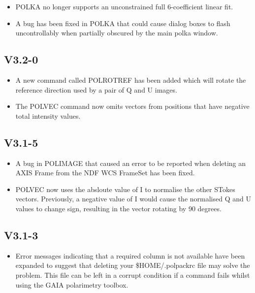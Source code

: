 \documentclass[twoside,11pt]{starlink}
\begin{document}
\begin{itemize}
 \item POLKA no longer supports an unconstrained full 6-coefficient linear fit.
 \item A bug has been fixed in POLKA that could cause dialog boxes to flash
  uncontrollably when partially obscured by the main polka window.
\end{itemize}


\subsection{V3.2-0}

\begin{itemize}
 \item A new command called POLROTREF has been added which will rotate
 the reference direction used by a pair of Q and U images.
 \item The POLVEC command now omits vectors from positions that have
 negative total intensity values.
\end{itemize}


\subsection{V3.1-5}

\begin{itemize}
 \item A bug in POLIMAGE that caused an error to be reported when deleting
 an AXIS Frame from the NDF WCS FrameSet has been fixed.

 \item POLVEC now uses the absloute value of I to normalise the other STokes
 vectors. Previously, a negative value of I would cause the normalised Q
 and U values to change sign, resulting in the vector rotating by 90
 degrees.
\end{itemize}


\subsection{V3.1-3}

\begin{itemize}
 \item Error messages indicating that a required column is not available
 have been expanded to suggest that deleting your \$HOME/.polpackrc
 file may solve the problem. This file can be left in a corrupt condition
 if a command fails whilst using the GAIA polarimetry toolbox.

\end{itemize}
\end{document}
